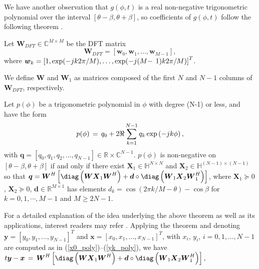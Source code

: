 We have another observation that
$g(\phi, t)$ is
a real non-negative trigonometric polynomial
over the interval
$[\theta - \beta,\theta + \beta]$, so
coefficients of $g(\phi, t)$ follow the following theorem \cite{Davidson02}.
\begin{definition}
Let $
\boldsymbol{W}_{DFT} \in \mathbb{C}^{M \times M}
$
be the DFT matrix
\begin{equation*}
  \boldsymbol{W}_{DFT} = \left [ \boldsymbol{w}_0, \boldsymbol{w}_1,\ldots,\boldsymbol{w}_{M-1} \right ],
\end{equation*}
where
$
\boldsymbol{w}_k = \left[ 1, \exp(-jk2\pi/M),\ldots,\exp(-j(M-
\right. \linebreak \left.
1)k 2\pi/M)\right]^T
$.
\end{definition}
We define $\boldsymbol{W}$ and $\boldsymbol{W}_1$ as matrices composed of the first $N$ and $N-1$
columns of $\boldsymbol{W}_{DFT}$, respectively.
\begin{theorem}
Let $p(\phi)$ be a trigonometric polynomial in $\phi$ with degree (N-1) or less, and have the form
$$
p(\phi)\thinspace = \thinspace q_0 + 2\Re \sum \limits_{k =1}^{N-1} q_k \exp \left(-jk\phi \right),
 $$
 with $\boldsymbol{q} = [q_0, q_1,q_2,\ldots,q_{N-1}] \in \mathbb{R} \times \mathbb{C}^{N-1}$.
 $p(\phi)$ is non-negative on $[\theta - \beta,\theta + \beta]$ %
 if and only if there exist
 $\boldsymbol{X}_1 \in \mathbb{H}^{N \times N}$ and $\boldsymbol{X}_2 \in \mathbb{H}^{(N-1)\times (N-1)}$ so that
 $ \boldsymbol{q} =
 \boldsymbol{W}^H \left [\diag \left ( \boldsymbol{W} \boldsymbol{X}_1 \boldsymbol{W}^H \right ) +
 \boldsymbol{d}\circ \diag \left ( \boldsymbol{W}_1 \boldsymbol{X}_2 \boldsymbol{W}_1^H \right )\right]$,
 where
 $\boldsymbol{X}_1 \succeq 0$, $\boldsymbol{X}_2 \succeq 0$,
  $\boldsymbol{d} \in \mathbb{R}^{M \times 1}$ has elements
 $d_k = \cos(2\pi k/M-\theta)-\cos\beta$ for $k = 0,1,\cdots, M-1$
 and $M \geq 2N - 1$.
 \end{theorem}
 For a detailed explanation of the idea underlying the above theorem as well as its applications,
 interest readers may refer \cite{Roh06}.
 Applying the theorem and
 denoting
 $\boldsymbol{y} = \left [y_0, y_1,\ldots,y_{N-1}\right ]^T$ and
 $\boldsymbol{x} = \left [x_0, x_1,\ldots,x_{N-1}\right]^T$, with
 $x_i$, $y_i$, $ i = 0,1,\ldots,N-1$ are computed as in
 (\ref{x0_poly})--(\ref{yk_poly}),
  we have
  $
   t \boldsymbol{y} - \boldsymbol{x}
   \thinspace  = \thinspace
   \boldsymbol{W}^H \left [\diag \left ( \boldsymbol{W} \boldsymbol{X}_1 \boldsymbol{W}^H \right ) + \\
 \boldsymbol{d}\circ \diag \left ( \boldsymbol{W}_1 \boldsymbol{X}_2 \boldsymbol{W}_1^H \right )\right],
 $


